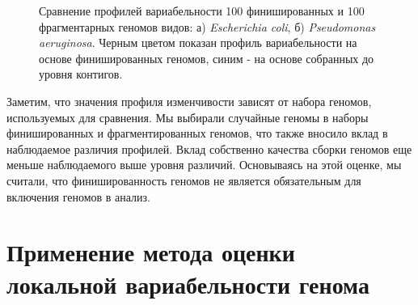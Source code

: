 \begin{figure}[!ht] 
  \center
  \caption{Сравнение профилей вариабельности 100 финишированных и 100 фрагментарных геномов видов: а) \textit{Escherichia coli}, б) \textit{Pseudomonas aeruginosa}. Черным цветом показан профиль вариабельности на основе финишированных геномов, синим - на основе собранных до уровня контигов.}
  \label{img:compl_dr_coli} 
\end{figure}

Заметим, что значения профиля изменчивости зависят от набора геномов, используемых для сравнения. Мы выбирали случайные геномы в наборы финишированных и фрагментированных геномов, что также вносило вклад в наблюдаемое различия профилей. Вклад собственно качества сборки геномов еще меньше наблюдаемого выше уровня различий. Основываясь на этой оценке, мы считали, что финишированность геномов не является обязательным для включения геномов в анализ.

\section{Применение метода оценки локальной вариабельности генома}


